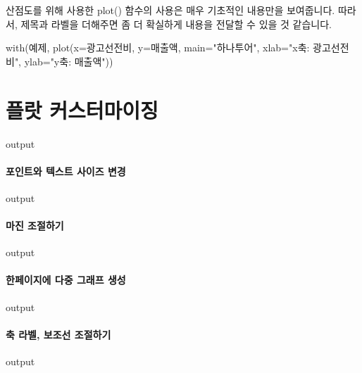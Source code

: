 산점도를 위해 사용한 plot() 함수의 사용은 매우 기초적인 내용만을 보여줍니다. 
따라서, 제목과 라벨을 더해주면 좀 더 확실하게 내용을 전달할 수 있을 것 같습니다. 

\begin{Schunk}
\begin{Soutput}
with(예제, plot(x=광고선전비, y=매출액, main="하나투어", xlab="x축: 광고선전비", ylab="y축: 매출액"))
\end{Soutput}
\end{Schunk}

\section{플랏 커스터마이징}

\begin{Schunk}
\begin{Soutput}
output
\end{Soutput}
\end{Schunk}

\paragraph{포인트와 텍스트 사이즈 변경}
\begin{Schunk}
\begin{Soutput}
output
\end{Soutput}
\end{Schunk}

\paragraph{마진 조절하기}
\begin{Schunk}
\begin{Soutput}
output
\end{Soutput}
\end{Schunk}

\paragraph{한페이지에 다중 그래프 생성}

\begin{Schunk}
\begin{Soutput}
output
\end{Soutput}
\end{Schunk}

\paragraph{축 라벨, 보조선 조절하기}
\begin{Schunk}
\begin{Soutput}
output
\end{Soutput}
\end{Schunk}


